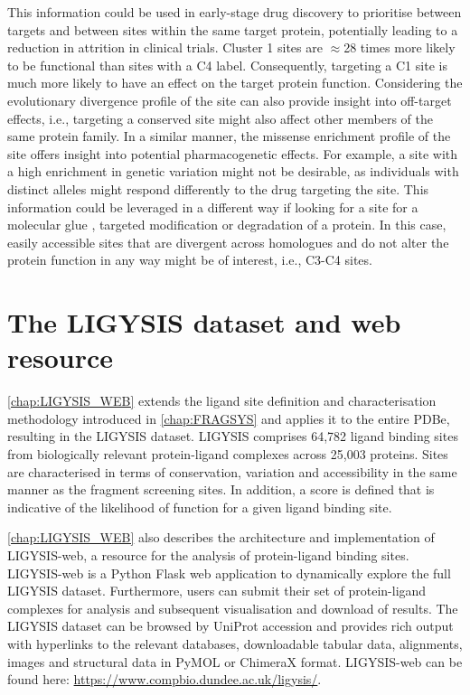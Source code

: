 This information could be used in early-stage drug discovery to prioritise between targets and between sites within the same target protein, potentially leading to a reduction in attrition in clinical trials. Cluster 1 sites are $\approx$28 times more likely to be functional than sites with a C4 label. Consequently, targeting a C1 site is much more likely to have an effect on the target protein function. Considering the evolutionary divergence profile of the site can also provide insight into off-target effects, i.e., targeting a conserved site might also affect other members of the same protein family. In a similar manner, the missense enrichment profile of the site offers insight into potential pharmacogenetic effects. For example, a site with a high enrichment in genetic variation might not be desirable, as individuals with distinct alleles might respond differently to the drug targeting the site. This information could be leveraged in a different way if looking for a site for a molecular glue \cite{SCHREIBER_2021_GLUES}, targeted modification \cite{BREWER_2024_ATLAS, BREWER_2024_SMAD3, ZHAO_2024_TFEB} or degradation \cite{ZENGERLE_2015_BRD4, GADD_2017_PROTAC} of a protein. In this case, easily accessible sites that are divergent across homologues and do not alter the protein function in any way might be of interest, i.e., C3-C4 sites.

\section{The LIGYSIS dataset and web resource}

\autoref{chap:LIGYSIS_WEB} extends the ligand site definition and characterisation methodology introduced in \autoref{chap:FRAGSYS} and applies it to the entire PDBe, resulting in the LIGYSIS dataset. LIGYSIS comprises 64,782 ligand binding sites from biologically relevant protein-ligand complexes across 25,003 proteins. Sites are characterised in terms of conservation, variation and accessibility in the same manner as the fragment screening sites. In addition, a score is defined that is indicative of the likelihood of function for a given ligand binding site. 

\autoref{chap:LIGYSIS_WEB} also describes the architecture and implementation of LIGYSIS-web, a resource for the analysis of protein-ligand binding sites. LIGYSIS-web is a Python Flask web application to dynamically explore the full LIGYSIS dataset. Furthermore, users can submit their set of protein-ligand complexes for analysis and subsequent visualisation and download of results. The LIGYSIS dataset can be browsed by UniProt accession and provides rich output with hyperlinks to the relevant databases, downloadable tabular data, alignments, images and structural data in PyMOL or ChimeraX format. LIGYSIS-web can be found here: \url{https://www.compbio.dundee.ac.uk/ligysis/}.

